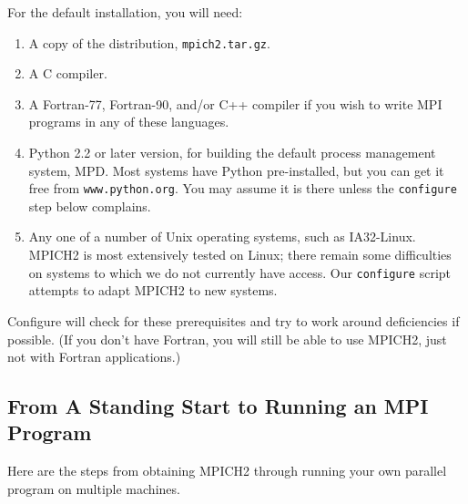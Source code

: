 \documentclass[dvipdfm,11pt]{article}
\begin{document}
For the default installation, you will need:
\begin{enumerate}
\item A copy of the distribution, \texttt{mpich2.tar.gz}.
\item A C compiler.
\item A Fortran-77, Fortran-90, and/or C++ compiler if you wish to write
  MPI programs in any of these languages.
\item Python 2.2 or later version, for building the default process
  management system, MPD.
  Most systems have
  Python pre-installed, but you can get it free from
  \texttt{www.python.org}.  You may assume it is there unless the
  \texttt{configure} step below complains.
\item Any one of a number of Unix operating systems, such as IA32-Linux.
  MPICH2 is most extensively tested on Linux;  there remain some
  difficulties on systems to which we do not currently have access.  Our
  \texttt{configure} script attempts to adapt MPICH2 to new systems. 
\end{enumerate}
Configure will check for these prerequisites and try to work around
deficiencies if possible.  (If you don't have Fortran, you will
still be able to use MPICH2, just not with Fortran applications.)


\subsection{From A Standing Start to Running an MPI Program}
\label{sec:steps}
Here are the steps from obtaining MPICH2 through running your own
parallel program on multiple machines.
\end{document}
